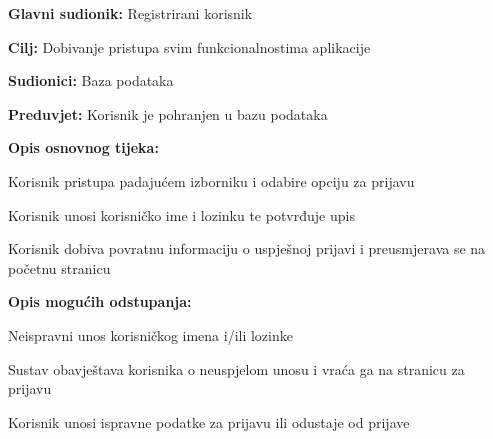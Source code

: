 					\noindent {}
					\begin{packed_item}
					
						\item \textbf{Glavni sudionik: } Registrirani korisnik 
						\item  \textbf{Cilj:} Dobivanje pristupa svim funkcionalnostima aplikacije
						\item  \textbf{Sudionici:} Baza podataka 
						\item  \textbf{Preduvjet:} Korisnik je pohranjen u bazu podataka
						\item  \textbf{Opis osnovnog tijeka:}
					
						\item[] \begin{packed_enum}
						
							\item Korisnik pristupa padajućem izborniku i odabire opciju za prijavu 
							\item Korisnik unosi korisničko ime i lozinku te potvrđuje upis
							\item Korisnik dobiva povratnu informaciju o uspješnoj prijavi i preusmjerava se na početnu stranicu
						
						\end{packed_enum}
					
						\item  \textbf{Opis mogućih odstupanja:}
					
						\item[] \begin{packed_item}
						
							\item[2.a] Neispravni unos korisničkog imena i/ili lozinke  
							\item[] \begin{packed_enum}
							
								\item Sustav obavještava korisnika o neuspjelom unosu i vraća ga na stranicu za prijavu  
								\item Korisnik unosi ispravne podatke za prijavu ili odustaje od prijave
							
							\end{packed_enum}
						\end{packed_item}
					\end{packed_item}
				
